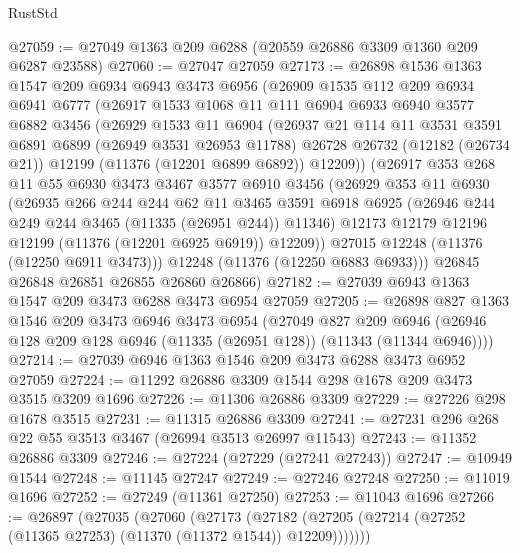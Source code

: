 \begin{lexlean}{RustStd}
\begin{coremodule}
{\begin{coremodule}
{{{{{{{{{{{{{{{{{{{{{{{{{{{{{{{{{{{{{{{{{{{{{{{{{{{{{{{{{{{{{{{{{{{{{{{{{{{{{{{{{{{{{@27059 := @27049 @1363 @209 @6288 (@20559 @26886 @3309 @1360 @209 @6287 @23588)
@27060 := @27047 @27059
@27173 := @26898
    @1536
    @1363
    @1547
    @209
    @6934
    @6943
    @3473
    @6956
    (@26909
      @1535
      @112
      @209
      @6934
      @6941
      @6777
      (@26917
        @1533
        @1068
        @11
        @111
        @6904
        @6933
        @6940
        @3577
        @6882
        @3456
        (@26929
          @1533
          @11
          @6904
          (@26937
            @21
            @114
            @11
            @3531
            @3591
            @6891
            @6899
            (@26949 @3531 @26953 @11788)
            @26728
            @26732
            (@12182 (@26734 @21))
            @12199
            (@11376 (@12201 @6899 @6892))
            @12209))
        (@26917
          @353
          @268
          @11
          @55
          @6930
          @3473
          @3467
          @3577
          @6910
          @3456
          (@26929
            @353
            @11
            @6930
            (@26935
              @266
              @244
              @244
              @62
              @11
              @3465
              @3591
              @6918
              @6925
              (@26946 @244 @249 @244 @3465 (@11335 (@26951 @244)) @11346)
              @12173
              @12179
              @12196
              @12199
              (@11376 (@12201 @6925 @6919))
              @12209))
          @27015
          @12248
          (@11376 (@12250 @6911 @3473)))
        @12248
        (@11376 (@12250 @6883 @6933)))
      @26845
      @26848
      @26851
      @26855
      @26860
      @26866)
@27182 := @27039 @6943 @1363 @1547 @209 @3473 @6288 @3473 @6954 @27059
@27205 := @26898
    @827
    @1363
    @1546
    @209
    @3473
    @6946
    @3473
    @6954
    (@27049
      @827
      @209
      @6946
      (@26946 @128 @209 @128 @6946 (@11335 (@26951 @128)) (@11343 (@11344 @6946))))
@27214 := @27039 @6946 @1363 @1546 @209 @3473 @6288 @3473 @6952 @27059
@27224 := @11292 @26886 @3309 @1544 @298 @1678 @209 @3473 @3515 @3209 @1696
@27226 := @11306 @26886 @3309
@27229 := @27226 @298 @1678 @3515
@27231 := @11315 @26886 @3309
@27241 := @27231 @296 @268 @22 @55 @3513 @3467 (@26994 @3513 @26997 @11543)
@27243 := @11352 @26886 @3309
@27246 := @27224 (@27229 (@27241 @27243))
@27247 := @10949 @1544
@27248 := @11145 @27247
@27249 := @27246 @27248
@27250 := @11019 @1696
@27252 := @27249 (@11361 @27250)
@27253 := @11043 @1696
@27266 := @26897
    (@27035
      (@27060
        (@27173
          (@27182 (@27205 (@27214 (@27252 (@11365 @27253) (@11370 (@11372 @1544)) @12209)))))))
}}}}}}}}}}}}}}}}}}}}}}}}}}}}}}}}}}}}}}}}}}}}}}}}}}}}}}}}}}}}}}}}}}}}}}}}}}}}}}}}}}}}}
\end{coremodule}}
\end{coremodule}
\end{lexlean}
